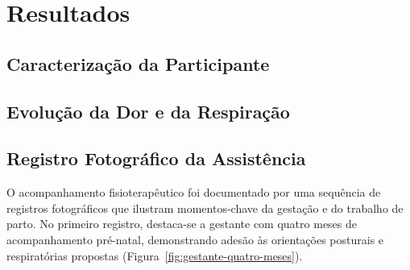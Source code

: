 \documentclass[openright]{tex/estilos/normas-utf-tex}
\begin{document}

\chapter{Resultados}
\label{chap:resultados}


\section{Caracterização da Participante}
\label{sec:caracterizacao}


\section{Evolução da Dor e da Respiração}
\label{sec:evolucao}


\section{Registro Fotográfico da Assistência}
\label{sec:registro-fotografico}

O acompanhamento fisioterapêutico foi documentado por uma sequência de registros fotográficos que ilustram momentos-chave da gestação e do trabalho de parto. No primeiro registro, destaca-se a gestante com quatro meses de acompanhamento pré-natal, demonstrando adesão às orientações posturais e respiratórias propostas (Figura~\ref{fig:gestante-quatro-meses}).
\end{document}
